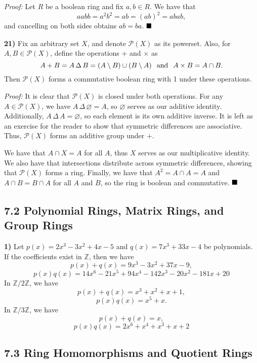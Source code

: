 \documentclass[12pt]{article}
\newcommand{\Z}{\mathbb{Z}}
\renewcommand{\t}[1]{\text{#1}}
\newcommand{\symdiff}{\, \Delta \,}
\newcommand{\sdiff}{\setminus}
\newcommand{\proof}{\textit{Proof: }}
\newcommand{\done}{\ensuremath{\strut\hfill\blacksquare}}
\newcommand{\mc}[1]{\ensuremath{\mathcal{#1}}}
\begin{document}
\proof
Let \( R \) be a boolean ring and fix \( a, b \in R \).
We have that
\[
	aabb = a^2b^2 = ab = (ab)^2 = abab,
\]
and cancelling on both sides obtains \( ab = ba \).
\done

\textbf{21)}
Fix an arbitrary set \( X \), and denote \( \mc{P}(X) \) as its powerset.
Also, for \( A, B \in \mc{P}(X) \), define the operations \( + \) and
\( \times \) as
\[
	A + B = A \symdiff B = (A \sdiff B) \cup (B \sdiff A)
	\hspace{0.1in}
	\t{and}
	\hspace{0.1in}
	A \times B = A \cap B.
\]
Then \( \mc{P}(X) \) forms a commutative boolean ring with 1 under these
operations.

\proof
It is clear that \( \mc{P}(X) \) is closed under both operations.
For any \( A \in \mc{P}(X) \), we have \( A \symdiff \varnothing = A \), so
\( \varnothing \) serves as our additive identity.
Additionally, \( A \symdiff A = \varnothing \), so each element is its own
additive inverse.
It is left as an exercise for the reader to show that symmetric differences
are associative.
Thus, \( \mc{P}(X) \) forms an additive group under \( + \).

We have that \( A \cap X = A \) for all \( A \), thus \( X \) serves as our
multiplicative identity.
We also have that intersections distribute across symmetric differences,
showing that \( \mc{P}(X) \) forms a ring.
Finally, we have that \( A^2 = A \cap A = A \) and \( A \cap B = B \cap A \)
for all \( A \) and \( B \), so the ring is boolean and commutative.
\done

\subsection*{7.2 Polynomial Rings, Matrix Rings, and Group Rings}

\textbf{1)}
Let \( p(x) = 2x^3 - 3x^2 + 4x - 5 \) and \( q(x) = 7x^3 + 33x - 4 \) be
polynomials.
If the coefficients exist in \( \Z \), then we have
\[
	p(x) + q(x) = 9x^3 - 3x^2 + 37x - 9,
\]
\[
	p(x)q(x) = 14x^6 - 21x^5 + 94x^4 - 142x^3 - 20x^2 - 181x + 20
\]
In \( \Z/2\Z \), we have
\[
	p(x) + q(x) = x^3 + x^2 + x + 1,
\]
\[
	p(x)q(x) = x^5 + x.
\]
In \( \Z/3\Z \), we have
\[
	p(x) + q(x) = x,
\]
\[
	p(x)q(x) = 2x^6 + x^4 + x^3 + x + 2
\]

\subsection*{7.3 Ring Homomorphisms and Quotient Rings}
\end{document}
